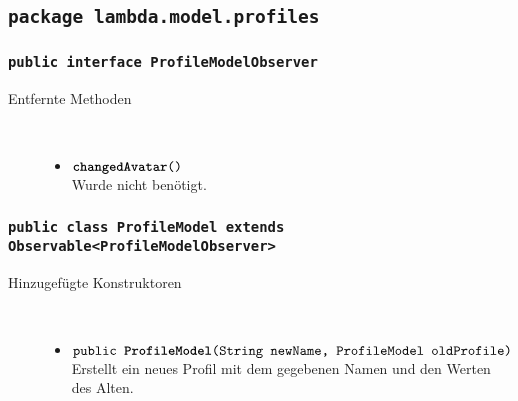 \subsection{\texttt{package lambda.model.profiles}}

\subsubsection{\normalfont \texttt{public interface \textbf{ProfileModelObserver}}}

\begin{description}
\item[Entfernte Methoden] \hfill \\
	\vspace{-.8cm}
	\begin{itemize}
		\item $\texttt{\textbf{changedAvatar}()}$ \\ Wurde nicht benötigt.
	\end{itemize}
\end{description}

\subsubsection{\normalfont \texttt{public class \textbf{ProfileModel} extends Observable<ProfileModelObserver>}}

\begin{description}
\item[Hinzugefügte Konstruktoren] \hfill \\
	\vspace{-.8cm}
	\begin{itemize}
		\item $\texttt{public \textbf{ProfileModel}(String newName, ProfileModel oldProfile)}$ \\ Erstellt ein neues Profil mit dem gegebenen Namen und den Werten des Alten.
	\end{itemize}
\end{description}